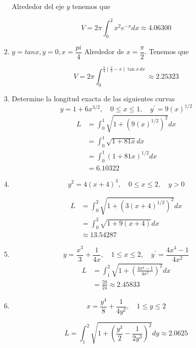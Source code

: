 \documentclass{report}
\begin{document}
\begin{enumerate}[label=\textcolor{Red}{\textbf{\arabic*.}}]
\begin{enumerate}[label=\textcolor{OliveGreen}{\textbf{\arabic*.}}]
                Alrededor del eje $y$ tenemos que

                $$
                V=2 \pi \int_{0}^{2} x^{2} e^{-x} d x \approx 4.06300
                $$

                \item $y = tanx, y= 0, x=\dfrac{pi}{4}$
                Alrededor de $x = \dfrac{\pi}{2}$. Tenemos que

                $$V = 2\pi\int_{0}^{\frac{\pi}{4}\left(\frac{\pi}{2}-x\right)\tan x\,dx} \approx 2.25323$$
            \item Determine la longitud exacta de las siguientes curvas
            $$
            y=1+6 x^{3 / 2}, \quad 0 \leq x \leq 1, \quad y^{\prime}=9(x)^{1 / 2}
            $$
            \begin{align*}
                L &= \int_{0}^{1} \sqrt{1+\left(9(x)^{1 / 2}\right)^{2}} dx \\
                &= \int_{0}^{1} \sqrt{1+81 x} dx \\
                &= \int_{0}^{1}(1+81 x)^{1 / 2} dx\\
                &= 6.10322
            \end{align*}

            \item $$
            y^{2}=4(x+4)^{3}, \quad 0 \leq x \leq 2, \quad y>0
            $$

            \begin{align*}
                L &= \int_{0}^{2} \sqrt{1 + \left(3(x+4)^{1/2}\right)^{2}} dx \\
                &= \int_{0}^{2} \sqrt{1 + 9(x+4)} dx \\
                &\approx 13.54287
            \end{align*}
            \item $$
            y=\frac{x^{3}}{3}+\frac{1}{4 x}, \quad 1 \leq x \leq 2, \quad y^{\prime}=\frac{4 x^{4}-1}{4 x^{2}}
            $$
            \begin{align*}
                L &= \int_{1}^{2} \sqrt{1+\left(\frac{4 x^{4}-1}{4 x^{2}}\right)^{2}} d x \\
                &= \frac{59}{24} \approx 2.45833
            \end{align*}
            \item $$
            x=\frac{y^{4}}{8}+\frac{1}{4 y^{2}}, \quad 1 \leq y \leq 2
            $$

            $$L=\int_{1}^{2} \sqrt{1+\left(\frac{y^{3}}{2}-\frac{1}{2 y^{3}}\right)^{2}} dy \approx 2.0625 $$


\end{enumerate}
\end{enumerate}
\end{document}
